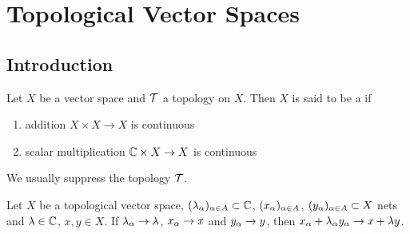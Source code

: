 \documentclass{book}
\begin{document}




























































	\newpage
	\chapter{Topological Vector Spaces}
	
	\section{Introduction}
	
	\begin{defn}
		Let $X$ be a vector space and $\mathcal{T}$ a topology on $X$. Then $X$ is said to be a  if
		\begin{enumerate}
			\item  addition $X \times X \rightarrow X$ is continuous  \item scalar multiplication $\mathbb{C} \times X \rightarrow X$ is continuous
		\end{enumerate}
	\end{defn}
	
	\begin{note}
		We usually suppress the topology $\mathcal{T}$.
	\end{note}

	\begin{ex}
		Let $X$ be a topological vector space, $(\lambda_{\alpha})_{\alpha \in A} \subset \mathbb{C}$, $(x_{\alpha})_{\alpha \in A}$, $(y_{\alpha})_{\alpha \in A} \subset X$ nets and $\lambda \in \mathbb{C}$, $x, y \in X$. If $\lambda_{\alpha} \rightarrow \lambda$, $x_{\alpha} \rightarrow x$ and $y_{\alpha} \rightarrow y$, then $x_{\alpha} + \lambda_{\alpha}y_{\alpha} \rightarrow x + \lambda y$.
	\end{ex}
\end{document}
